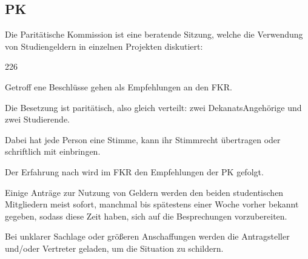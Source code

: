 \subsection{PK}
Die Paritätische Kommission ist eine beratende Sitzung, welche die 
Verwendung von Studiengeldern in einzelnen Projekten diskutiert:
\begin{dinglist}{226}
\item Getroff ene Beschlüsse gehen als Empfehlungen an den FKR. 
\item Die Besetzung ist paritätisch, also gleich verteilt: zwei DekanatsAngehörige und zwei Studierende. 
\item Dabei hat jede Person eine Stimme, kann ihr Stimmrecht übertragen 
oder schriftlich mit einbringen. 
\item Der Erfahrung nach wird im FKR den Empfehlungen der PK gefolgt. 
\item Einige Anträge zur Nutzung von Geldern werden den beiden 
studentischen Mitgliedern meist sofort, manchmal bis spätestens 
einer Woche vorher bekannt gegeben, sodass diese Zeit haben, sich 
auf die Besprechungen vorzubereiten. 
\item Bei unklarer Sachlage oder größeren Anschaffungen werden die 
Antragsteller und/oder Vertreter geladen, um die Situation zu 
schildern.
\end{dinglist}